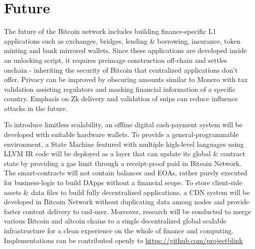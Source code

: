 \documentclass[../Bitcoin Blink.tex]{subfiles}
\begin{document}
\section{Future}

The future of the Bitcoin network includes building finance-specific L1 applications such as exchanges, bridges, lending \& borrowing, insurance, token minting and bank mirrored wallets. Since these applications are developed inside an unlocking script, it requires preimage construction off-chain and settles onchain - inheriting the security of Bitcoin that centralized applications don't offer. Privacy can be improved by obscuring amounts similar to Monero with tax validation assisting regulators and masking financial information of a specific country. Emphasis on Zk delivery and validation of snips can reduce influence attacks in the future. 

To introduce limitless scalability, an offline digital cash-payment system will be developed with suitable hardware wallets. To provide a general-programmable environment, a State Machine featured with multiple high-level languages using LLVM \cite{llvm} IR code will be deployed as a layer that can update its global \& contract state by providing a gas limit through a receipt-proof paid in Bitcoin Network. The smart-contracts will not contain balances and EOAs, rather purely executed for business-logic to build DApps without a financial scope. To store client-side assets \& data files to build fully decentralized applications, a CDN system will be developed in Bitcoin Network without duplicating data among nodes and provide faster content delivery to end-user. Moreover, research will be conducted to merge various Bitcoin and altcoin chains to a single decentralized global scalable infrastructure for a clean experience on the whole of finance and computing.\\

\noindent Implementations can be contributed openly to \url{https://github.com/projectblink}
\end{document}
